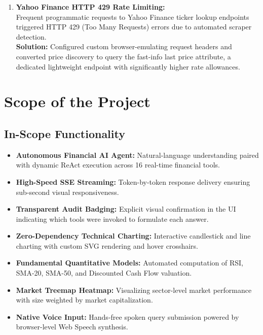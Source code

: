 \documentclass[12pt,a4paper]{report}
\begin{document}
\begin{enumerate}[leftmargin=*,label=\textbf{\arabic*.}]
  \vspace{0.4cm}

  \item \textbf{Yahoo Finance HTTP 429 Rate Limiting:}\\
  Frequent programmatic requests to Yahoo Finance ticker lookup endpoints triggered HTTP 429 (Too Many Requests) errors due to automated scraper detection. \\
  \textbf{Solution:} Configured custom browser-emulating request headers and converted price discovery to query the fast-info last price attribute, a dedicated lightweight endpoint with significantly higher rate allowances.
\end{enumerate}

\clearpage
\chapter{Scope of the Project}

\section{In-Scope Functionality}

\begin{itemize}[leftmargin=*,label=$\bullet$]
  \item \textbf{Autonomous Financial AI Agent:} Natural-language understanding paired with dynamic ReAct execution across 16 real-time financial tools.
  \item \textbf{High-Speed SSE Streaming:} Token-by-token response delivery ensuring sub-second visual responsiveness.
  \item \textbf{Transparent Audit Badging:} Explicit visual confirmation in the UI indicating which tools were invoked to formulate each answer.
  \item \textbf{Zero-Dependency Technical Charting:} Interactive candlestick and line charting with custom SVG rendering and hover crosshairs.
  \item \textbf{Fundamental Quantitative Models:} Automated computation of RSI, SMA-20, SMA-50, and Discounted Cash Flow valuation.
  \item \textbf{Market Treemap Heatmap:} Visualizing sector-level market performance with size weighted by market capitalization.
  \item \textbf{Native Voice Input:} Hands-free spoken query submission powered by browser-level Web Speech synthesis.
\end{itemize}
\end{document}
